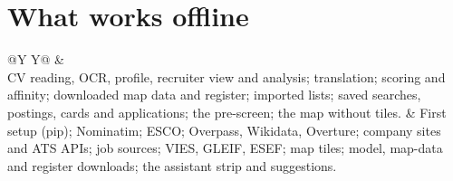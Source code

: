 \section{What works offline}
{\small
\begin{tabularx}{\textwidth}{@{}Y Y@{}}
\toprule
\hdr {} &  \\
\midrule
CV reading, OCR, profile, recruiter view and analysis; translation; scoring and affinity; downloaded map data and
register; imported lists; saved searches, postings, cards and applications; the pre-screen; the map without tiles.
&
First setup (pip); Nominatim; ESCO; Overpass, Wikidata, Overture; company sites and ATS APIs; job sources; VIES,
GLEIF, ESEF; map tiles; model, map-data and register downloads; the assistant strip and suggestions. \\
\bottomrule
\end{tabularx}
}
